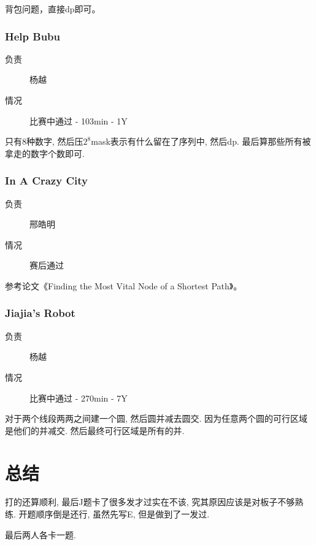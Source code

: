\documentclass[a4paper, 11pt, nofonts, nocap, fancyhdr]{ctexart}
\newcommand{\problem}[1]{\subsubsection{#1}}
\begin{document}
背包问题，直接dp即可。

\problem{Help Bubu}

\begin{description}
\item[负责] 杨越
\item[情况] 比赛中通过 - 103min - 1Y
\end{description}

只有8种数字, 然后压$2^8$mask表示有什么留在了序列中, 然后dp. 最后算那些所有被拿走的数字个数即可.

\problem{In A Crazy City}

\begin{description}
\item[负责] 邢皓明
\item[情况] 赛后通过
\end{description}

参考论文《Finding the Most Vital Node of a Shortest Path》。

\problem{Jiajia's Robot}

\begin{description}
\item[负责] 杨越
\item[情况] 比赛中通过 - 270min - 7Y
\end{description}

对于两个线段两两之间建一个圆, 然后圆并减去圆交. 因为任意两个圆的可行区域是他们的并减交. 然后最终可行区域是所有的并. 

\section{总结}

打的还算顺利, 最后J题卡了很多发才过实在不该, 究其原因应该是对板子不够熟练. 开题顺序倒是还行, 虽然先写E, 但是做到了一发过. 

最后两人各卡一题.
\end{document}
